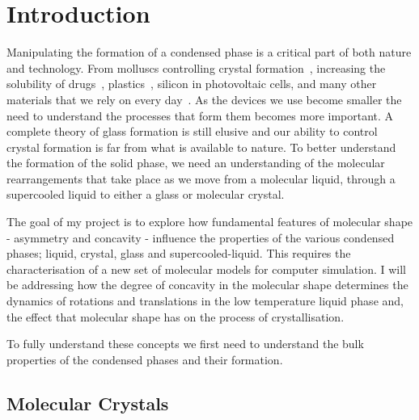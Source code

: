 
\chapter{Introduction}


Manipulating the formation of a condensed phase is a critical part of both nature and technology. From molluscs controlling crystal formation~\cite{de-yoreo:03}, increasing the solubility of drugs~\cite{hancock:00}, plastics~\cite{bennemann:99}, silicon in photovoltaic cells\tocite, and many other materials that we rely on every day~\cite{kim:07}. As the devices we use become smaller the need to understand the processes that form them becomes more important. A complete theory of glass formation is still elusive and our ability to control crystal formation is far from what is available to nature. To better understand the formation of the solid phase, we need an understanding of the molecular rearrangements that take place as we move from a molecular liquid, through a supercooled liquid to either a glass or molecular crystal.

The goal of my project is to explore how fundamental features of molecular shape - asymmetry and concavity - influence the properties of the various condensed phases; liquid, crystal, glass and supercooled-liquid. This requires the characterisation of a new set of molecular models for computer simulation. I will be addressing how the degree of concavity in the molecular shape determines the dynamics of rotations and translations in the low temperature liquid phase and, the effect that molecular shape has on the process of crystallisation.

To fully understand these concepts we first need to understand the bulk properties of the condensed phases and their formation.


\section{Molecular Crystals}
\label{sec:molecular crystals}

